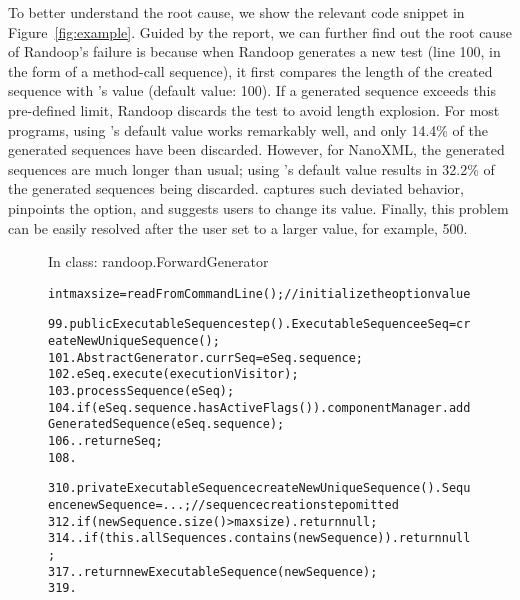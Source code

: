 To better understand the root cause, we show
the relevant code snippet in Figure~\ref{fig:example}.
Guided by the report, we can further find out
the root cause of Randoop's failure
is because when Randoop generates a new
test (line 100, in the form of a method-call sequence),
it first compares the length of the created sequence with
's value (default value: 100). If a
generated sequence exceeds this pre-defined limit,
Randoop discards the test to avoid length explosion.
For most programs, using 's default value works remarkably
well, and only 14.4\% of the generated sequences have been discarded.
However, for NanoXML, the generated sequences are
much longer than usual; using 's default value
results in 32.2\% of the generated sequences being discarded.
\ourtool captures such deviated behavior, pinpoints the
 option, and suggests users to change its value.
Finally, this problem can be easily resolved after
the user set  to a larger value, for example, 500.

\begin{figure}[t]
\vspace{-2mm}
{In class: randoop.ForwardGenerator}\\
\vspace{-4mm}
\begin{CodeOut}
\begin{alltt}
int maxsize = readFromCommandLine(); //{initialize the option value}

99.  public ExecutableSequence step() .   ExecutableSequence eSeq = createNewUniqueSequence();
101.   AbstractGenerator.currSeq = eSeq.sequence;
102.   eSeq.execute(executionVisitor);
103.   processSequence(eSeq);
104.   if (eSeq.sequence.hasActiveFlags()) .     componentManager.addGeneratedSequence(eSeq.sequence);
106.   .   return eSeq;
108. \ttrcb

310. private ExecutableSequence createNewUniqueSequence() .   Sequence newSequence = ...; //sequence creation step omitted
312.   if (newSequence.size() > maxsize) .     return null;
314.   .   if (this.allSequences.contains(newSequence)) .     return null;
317.   .   return new ExecutableSequence(newSequence);
319. \ttrcb
\end{alltt}
\end{CodeOut}
\tinystep
\vspace*{-3.0ex}  %
\end{figure}





